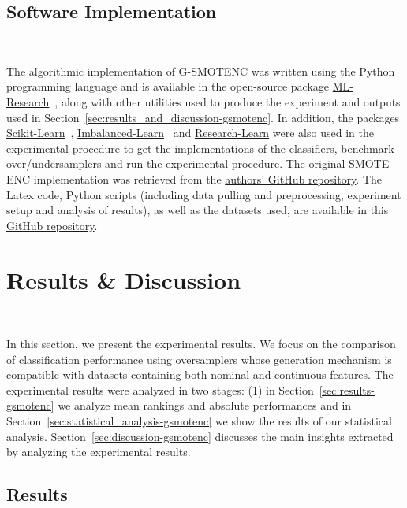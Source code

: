 \subsection{Software Implementation}~\label{sec:software_implementation-gsmotenc}

The algorithmic implementation of G-SMOTENC was written using the Python
programming language and is available in the open-source package
\href{https://github.com/joaopfonseca/ml-research}{ML-Research}~\cite{Fonseca2021al},
along with other utilities used to produce the experiment and outputs used in
Section~\ref{sec:results_and_discussion-gsmotenc}. In addition, the packages
\href{https://github.com/scikit-learn/scikit-learn/}{Scikit-Learn}~\cite{Pedregosa2011},
\href{https://github.com/scikit-learn-contrib/imbalanced-learn}{Imbalanced-Learn}~\cite{JMLR:v18:16-365}
and \href{https://github.com/georgedouzas/research-learn/}{Research-Learn}
were also used in the experimental procedure to get the implementations of the
classifiers, benchmark over/undersamplers and run the experimental procedure.
The original SMOTE-ENC implementation was retrieved from the
\href{https://github.com/Mimimkh/SMOTE-ENC-code}{authors' GitHub repository}.
The Latex code, Python scripts (including data pulling and preprocessing,
experiment setup and analysis of results), as well as the datasets used, are
available in this \href{https://github.com/joaopfonseca/publications}{GitHub
repository}.
 
\section{Results \& Discussion}~\label{sec:results_and_discussion-gsmotenc}

In this section, we present the experimental results. We focus on the
comparison of classification performance using oversamplers whose generation
mechanism is compatible with datasets containing both nominal and continuous
features. The experimental results were analyzed in two stages: (1) in
Section~\ref{sec:results-gsmotenc} we analyze mean rankings and absolute performances
and in Section~\ref{sec:statistical_analysis-gsmotenc} we show the results of our
statistical analysis. Section~\ref{sec:discussion-gsmotenc} discusses the main
insights extracted by analyzing the experimental results.

\subsection{Results}~\label{sec:results-gsmotenc}

